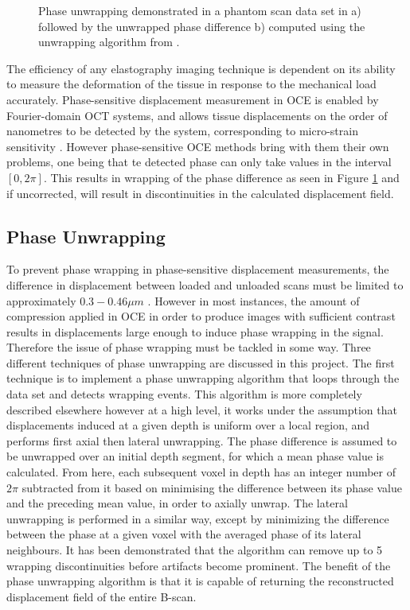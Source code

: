 \begin{figure}
\begin{subfigure}{0.45\textwidth}
	\end{subfigure}
	\label{phase_wrapping}
	\caption{Phase unwrapping demonstrated in a phantom scan data set in a) followed by the unwrapped phase difference b) computed using the unwrapping algorithm from \cite{kennedy_optical_2014}.}
\end{figure}


The efficiency of any elastography imaging technique is dependent on its ability to measure the deformation of the tissue in response to the mechanical load accurately. Phase-sensitive displacement measurement in OCE is enabled by Fourier-domain OCT systems, and allows tissue displacements on the order of nanometres to be detected by the system, corresponding to micro-strain sensitivity \cite{kennedy_review_2014}. However phase-sensitive OCE methods bring with them their own problems, one being that te detected phase can only take values in the interval $[0,2\pi]$. This results in wrapping of the phase difference as seen in Figure \ref{phase_wrapping} and if uncorrected, will result in discontinuities in the calculated displacement field.

\subsection{Phase Unwrapping}
To prevent phase wrapping in phase-sensitive displacement measurements, the difference in displacement between loaded and unloaded scans must be limited to approximately $0.3-0.46\mu m$ \cite{kennedy_optical_2014}. However in most instances, the amount of compression applied in OCE in order to produce images with sufficient contrast results in displacements large enough to induce phase wrapping in the signal. Therefore the issue of phase wrapping must be tackled in some way. Three different techniques of phase unwrapping are discussed in this project. The first technique is to implement a phase unwrapping algorithm that loops through the data set and detects wrapping events. This algorithm is more completely described elsewhere \cite{kennedy_optical_2014} however at a high level, it works under the assumption that displacements induced at a given depth is uniform over a local region, and performs first axial then lateral unwrapping. The phase difference is assumed to be unwrapped over an initial depth segment, for which a mean phase value is calculated. From here, each subsequent voxel in depth has an integer number of $2\pi$ subtracted from it based on minimising the difference between its phase value and the preceding mean value, in order to axially unwrap. The lateral unwrapping is performed in a similar way, except by minimizing the difference between the phase at a given voxel with the averaged phase of its lateral neighbours. It has been demonstrated that the algorithm can remove up to 5 wrapping discontinuities \cite{kennedy_optical_2014} before artifacts become prominent.
The benefit of the phase unwrapping algorithm is that it is capable of returning the reconstructed displacement field of the entire B-scan. 

